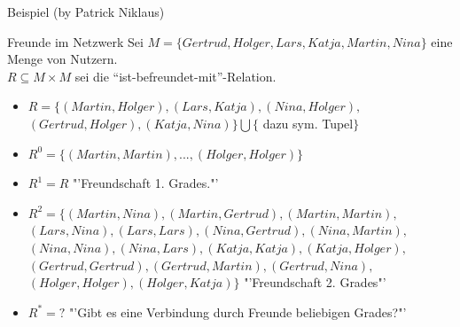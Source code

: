 	
	\begin{frame}{Beispiel (by Patrick Niklaus)}
		\begin{exampleblock}{Freunde im Netzwerk}
    		\small
			Sei $M = \{ Gertrud, Holger, Lars, Katja, Martin, Nina \}$ eine 
			Menge von Nutzern.\\
			$R \subseteq M \times M $ sei die 
			"`ist-befreundet-mit"'-Relation.
				
			\begin{itemize}
				\item $R = \{(Martin,Holger),(Lars,Katja),(Nina,Holger),$ \\
				$(Gertrud,Holger), (Katja, Nina) \} \bigcup \{$
				{dazu sym. Tupel}$\}$ \pause
					
				\item $R^0=\{ (Martin,Martin), ..., (Holger,Holger) \}$ \pause
				
				\item $R^1=R$ "'Freundschaft 1. Grades."' \pause
				
				\item $R^2=\{(Martin,Nina),(Martin,Gertrud),(Martin,Martin),$ \\
				
				$(Lars,Nina), (Lars,Lars), (Nina,Gertrud),(Nina,Martin),$ \\		
				$(Nina,Nina), (Nina,Lars), (Katja,Katja), (Katja,Holger), $ \\
				$(Gertrud,Gertrud), (Gertrud,Martin), (Gertrud,Nina), $ \\
				$(Holger,Holger), (Holger,Katja)\}$ "'Freundschaft 2. Grades"' 		
				\pause
				
				\item $R^*=?$ "'Gibt es eine Verbindung durch 
				Freunde beliebigen Grades?"'
			\end{itemize}
    	
		\end{exampleblock}
	\end{frame}
	
	
	

